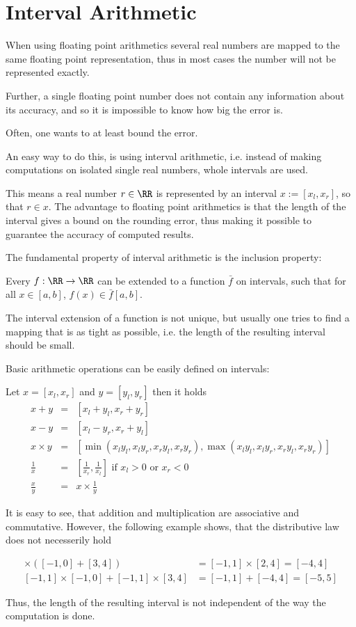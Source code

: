 \section{Interval Arithmetic}
	When using floating point arithmetics several real numbers are mapped to the
  same floating point representation, thus in most cases the number will not be
  represented exactly.

	Further, a single floating point number does not contain any information
  about its accuracy, and so it is impossible to know how big the error is.

	Often, one wants to at least bound the error. 
    
  An easy way to do this, is using interval arithmetic, i.e. instead of making
  computations on isolated single real numbers, whole intervals are used.

	This means a real number $r \in \RR$ is represented by an interval $x := [x_l,x_r]$, so that $r \in x$.
	The advantage to floating point arithmetics is that the length of the interval gives a bound on the rounding error, 
	thus making it possible to guarantee the accuracy of computed results.

	The fundamental property of interval arithmetic is the inclusion property:

	Every $f: \RR \to \RR$ can be extended to a function $\bar f$ on intervals, such that for all $x \in [a,b]$, $f(x) \in \bar f[a,b]$. 

	The interval extension of a function is not unique, but usually one tries to
  find a mapping that is as tight as possible, i.e. the length of the resulting interval
  should be small.
  
  Basic arithmetic operations can be easily defined on intervals:
	\begin{theorem}
		Let $x = [x_l, x_r]$ and $y = [y_l, y_r]$ then it holds
		\begin{eqnarray}
			x + y  & = & [x_l + y_l, x_r + y_r] \\
			x - y  & = & [x_l - y_r, x_r + y_l] \\
			x \times y  & = & [\min(x_ly_l, x_ly_r, x_ry_l, x_ry_r), \max(x_ly_l, x_ly_r, x_ry_l, x_ry_r)] \\
			\frac{1}{x} & = & \left[\frac{1}{x_r}, \frac{1}{x_l} \right] \text{ if } x_l > 0 \text{ or } x_r < 0 \\
			\frac{x}{y} & = & x \times \frac{1}{y}   
		\end{eqnarray}
	\end{theorem}
	It is easy to see, that addition and multiplication are associative and commutative.
	However, the following example shows, that the distributive law does not necesserily hold
	\begin{example}
		\begin{align*}
			[-1,1] \times ([-1,0] + [3,4])  &= [-1,1] \times [2,4] = [-4,4] \\
			[-1,1] \times [-1,0] + [-1,1] \times [3,4] &=  [-1,1] + [-4,4] =[-5,5] 
		\end{align*}
	\end{example} 
	Thus, the length of the resulting interval is not independent of the way the
  computation is done.
	
